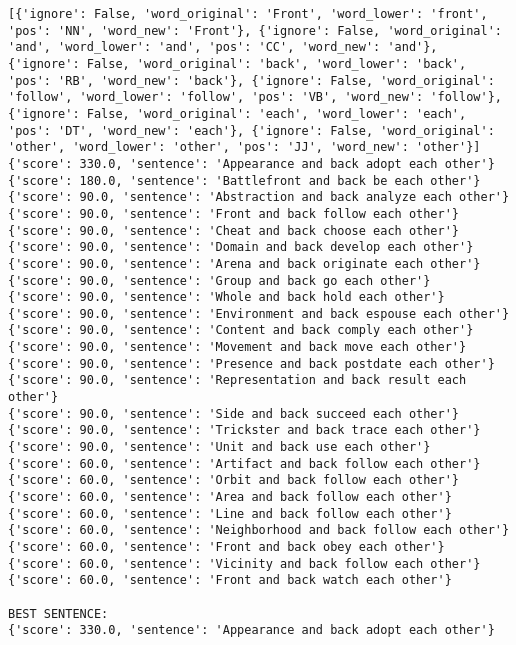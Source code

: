 \documentclass[12pt,a4paper,oneside]{book}
\begin{document}
\begin{verbatim}
[{'ignore': False, 'word_original': 'Front', 'word_lower': 'front', 'pos': 'NN', 'word_new': 'Front'}, {'ignore': False, 'word_original': 'and', 'word_lower': 'and', 'pos': 'CC', 'word_new': 'and'}, {'ignore': False, 'word_original': 'back', 'word_lower': 'back', 'pos': 'RB', 'word_new': 'back'}, {'ignore': False, 'word_original': 'follow', 'word_lower': 'follow', 'pos': 'VB', 'word_new': 'follow'}, {'ignore': False, 'word_original': 'each', 'word_lower': 'each', 'pos': 'DT', 'word_new': 'each'}, {'ignore': False, 'word_original': 'other', 'word_lower': 'other', 'pos': 'JJ', 'word_new': 'other'}]
{'score': 330.0, 'sentence': 'Appearance and back adopt each other'}
{'score': 180.0, 'sentence': 'Battlefront and back be each other'}
{'score': 90.0, 'sentence': 'Abstraction and back analyze each other'}
{'score': 90.0, 'sentence': 'Front and back follow each other'}
{'score': 90.0, 'sentence': 'Cheat and back choose each other'}
{'score': 90.0, 'sentence': 'Domain and back develop each other'}
{'score': 90.0, 'sentence': 'Arena and back originate each other'}
{'score': 90.0, 'sentence': 'Group and back go each other'}
{'score': 90.0, 'sentence': 'Whole and back hold each other'}
{'score': 90.0, 'sentence': 'Environment and back espouse each other'}
{'score': 90.0, 'sentence': 'Content and back comply each other'}
{'score': 90.0, 'sentence': 'Movement and back move each other'}
{'score': 90.0, 'sentence': 'Presence and back postdate each other'}
{'score': 90.0, 'sentence': 'Representation and back result each other'}
{'score': 90.0, 'sentence': 'Side and back succeed each other'}
{'score': 90.0, 'sentence': 'Trickster and back trace each other'}
{'score': 90.0, 'sentence': 'Unit and back use each other'}
{'score': 60.0, 'sentence': 'Artifact and back follow each other'}
{'score': 60.0, 'sentence': 'Orbit and back follow each other'}
{'score': 60.0, 'sentence': 'Area and back follow each other'}
{'score': 60.0, 'sentence': 'Line and back follow each other'}
{'score': 60.0, 'sentence': 'Neighborhood and back follow each other'}
{'score': 60.0, 'sentence': 'Front and back obey each other'}
{'score': 60.0, 'sentence': 'Vicinity and back follow each other'}
{'score': 60.0, 'sentence': 'Front and back watch each other'}

BEST SENTENCE:
{'score': 330.0, 'sentence': 'Appearance and back adopt each other'}



\end{verbatim}
\end{document}
